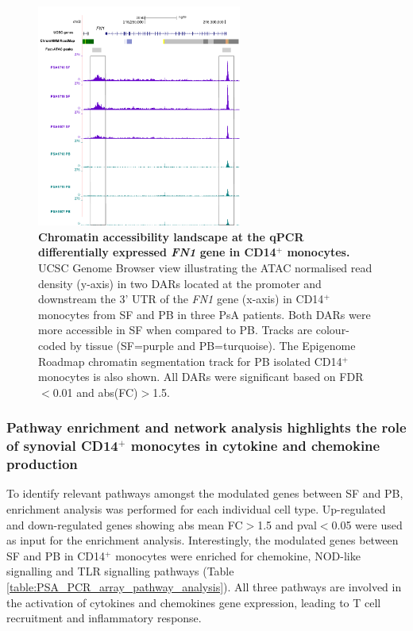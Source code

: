 \begin{figure}[htbp]
\centering
\includegraphics[width=0.6\textwidth]{./Results3/pdfs/PSA_CD14_ATAC_FN1_paired_gene_expression}
\caption[Chromatin accessibility landscape at the qPCR differentially expressed \textit{FN1} gene in CD14$^+$ monocytes.]{\textbf{Chromatin accessibility landscape at the qPCR differentially expressed \textit{FN1} gene in CD14$^+$ monocytes.} UCSC Genome Browser view illustrating the ATAC normalised read density (y-axis) in two DARs located at the promoter and downstream the 3' UTR of the \textit{FN1} gene (x-axis) in CD14$^+$ monocytes from SF and PB in three PsA patients. Both DARs were more accessible in SF when compared to PB. Tracks are colour-coded by tissue (SF=purple and PB=turquoise). The Epigenome Roadmap chromatin segmentation track for PB isolated CD14$^+$ monocytes is also shown. All DARs were significant based on FDR$<$0.01 and abs(FC)$>$1.5.}
\label{figure:PSA_CD14_ATAC_FN1}
\end{figure}


\subsubsection{Pathway enrichment and network analysis highlights the role of synovial CD14$^+$ monocytes in cytokine and chemokine production}
To identify relevant pathways amongst the modulated genes between SF and PB, enrichment analysis was performed for each individual cell type. Up-regulated and down-regulated genes showing abs mean FC$>$1.5 and pval$<$0.05 were used as input for the enrichment analysis. Interestingly, the modulated genes between SF and PB in CD14$^+$ monocytes were enriched for chemokine, NOD-like signalling and TLR signalling pathways (Table \ref{table:PSA_PCR_array_pathway_analysis}). All three pathways are involved in the activation of cytokines and chemokines gene expression, leading to T cell recruitment and inflammatory response. 

